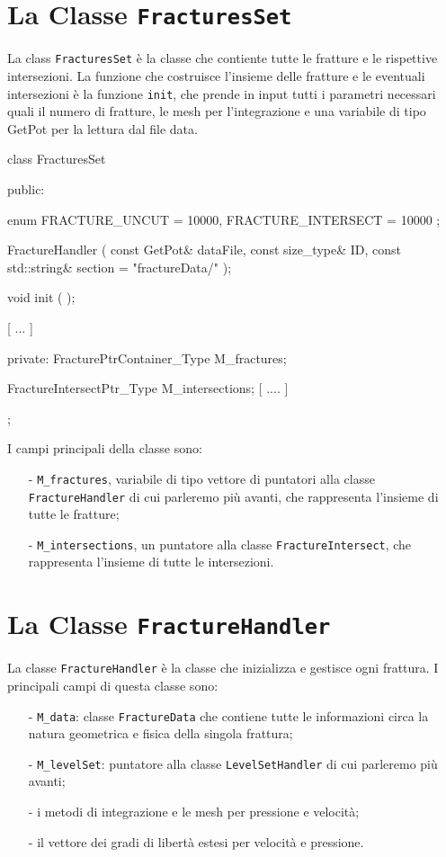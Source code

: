 \section{La Classe \texttt{FracturesSet}}
La class \texttt{FracturesSet} è la classe che contiente tutte le fratture e le rispettive intersezioni. La funzione che costruisce l'insieme delle fratture e le eventuali intersezioni è la funzione  \texttt{init}, che prende in input tutti i parametri necessari quali il numero di fratture, le mesh per l'integrazione e una variabile di tipo GetPot per la lettura dal file data. 

\begin{Code}[caption={Classe \texttt{FracturesSet}}]
class FracturesSet
{
public:

    enum
    {
        FRACTURE_UNCUT = 10000,
        FRACTURE_INTERSECT = 10000
    };

    FractureHandler ( const GetPot& dataFile,
                      const size_type& ID,
                      const std::string& section = "fractureData/" );

    void init ( );

    [ ... ]

private:
	FracturePtrContainer_Type M_fractures;

	FractureIntersectPtr_Type M_intersections;
	[ .... ]
};
\end{Code}
I campi principali della classe sono:
\begin{enumerate}
\item[-] \texttt{M\_fractures}, variabile di tipo vettore di puntatori alla classe \texttt{FractureHandler}  di cui parleremo più avanti, che rappresenta l'insieme di tutte le fratture;
\item[-] \texttt{M\_intersections}, un puntatore alla classe \texttt{FractureIntersect}, che rappresenta l'insieme di tutte le intersezioni. 
\end{enumerate}


\section{La Classe \texttt{FractureHandler}}

La classe  \texttt{FractureHandler} è la classe che inizializza e gestisce ogni frattura. I principali campi di questa classe sono:
\begin{enumerate}
\item[-] \texttt{M\_data}: classe \texttt{FractureData} che contiene tutte le informazioni circa la natura geometrica e fisica della singola frattura;
\item[-] \texttt{M\_levelSet}: puntatore alla classe \texttt{LevelSetHandler} di cui parleremo più avanti;
\item[-] i metodi di integrazione e le mesh per pressione e velocità;
\item[-] il vettore dei gradi di libertà estesi per velocità e pressione.
\end{enumerate}

